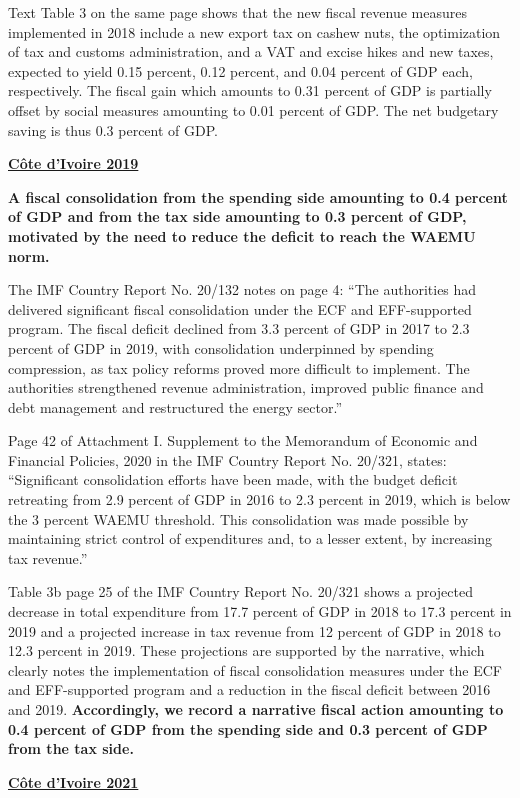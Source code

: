 Text Table 3 on the same page shows that the new fiscal revenue measures implemented in 2018 include a new export tax on cashew nuts, the optimization of tax and customs administration, and a VAT and excise hikes and new taxes, expected to yield 0.15 percent, 0.12 percent, and 0.04 percent of GDP each, respectively. The fiscal gain which amounts to 0.31 percent of GDP is partially offset by social measures amounting to 0.01 percent of GDP. The net budgetary saving is thus 0.3 percent of GDP.

\textbf{\underline{Côte d'Ivoire 2019}}

\textbf{A fiscal consolidation from the spending side amounting to 0.4 percent of GDP and from the tax side amounting to 0.3 percent of GDP, motivated by the need to reduce the deficit to reach the WAEMU norm.} 

The IMF Country Report No. 20/132 notes on page 4: “The authorities had delivered significant fiscal consolidation under the ECF and EFF-supported program. The fiscal deficit declined from 3.3 percent of GDP in 2017 to 2.3 percent of GDP in 2019, with consolidation underpinned by spending compression, as tax policy reforms proved more difficult to implement. The authorities strengthened revenue administration, improved public finance and debt management and restructured the energy sector.”

Page 42 of Attachment I. Supplement to the Memorandum of Economic and Financial Policies, 2020 in the IMF Country Report No. 20/321, states: “Significant consolidation efforts have been made, with the budget deficit retreating from 2.9 percent of GDP in 2016 to 2.3 percent in 2019, which is below the 3 percent WAEMU threshold. This consolidation was made possible by maintaining strict control of expenditures and, to a lesser extent, by increasing tax revenue.”

Table 3b page 25 of the IMF Country Report No. 20/321 shows a projected decrease in total expenditure from 17.7 percent of GDP in 2018 to 17.3 percent in 2019 and a projected increase in tax revenue from 12 percent of GDP in 2018 to 12.3 percent in 2019. These projections are supported by the narrative, which clearly notes the implementation of fiscal consolidation measures under the ECF and EFF-supported program and a reduction in the fiscal deficit between 2016 and 2019. \textbf{Accordingly, we record a narrative fiscal action amounting to 0.4 percent of GDP from the spending side and 0.3 percent of GDP from the tax side.}

\textbf{\underline{Côte d'Ivoire 2021}}

